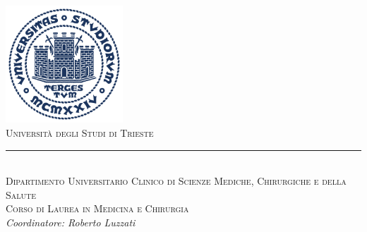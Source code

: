 
\begin{titlepage} %
\null\vfill
\begin{center}
\large
\sffamily
	\newcommand{\HRule}{\rule{\linewidth}{0.5mm}} %
	
	\center %
	
	
	\includegraphics[width=0.33\textwidth]{Figure/logoUniTs_tondo.pdf}\\[0.5cm] %
	 
	
	
	\textsc{\LARGE Universit\`a degli Studi di Trieste}\\
	\HRule\\[0.5cm] %
	
	\textsc{\Large Dipartimento Universitario Clinico di Scienze Mediche, Chirurgiche e della Salute}\\[0.5cm] %
	
	\textsc{\large Corso di Laurea in Medicina e Chirurgia}\\
	\textit{Coordinatore: Roberto Luzzati}\\ [0.5cm] %
	

\end{center}
\end{titlepage}
